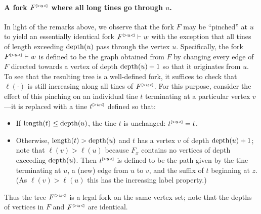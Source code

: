   \paragraph{A fork $\pinch{u}{F}$ where all long tines go through $u$.}
    In light of the remarks above, we observe that the fork $F$ may be
    ``pinched'' at $u$ to yield an essentially identical fork
    $\pinch{u}{F} \vdash w$ with the exception that all tines of length
    exceeding $\depth(u)$ pass through the vertex $u$. Specifically, the
    fork $\pinch{u}{F} \vdash w$ is defined to be the graph obtained
    from $F$ by changing every edge of $F$ directed towards a vertex of
    depth $\depth(u) + 1$ so that it originates from $u$. To see that
    the resulting tree is a well-defined fork, it suffices to check that
    $\ell(\cdot)$ is still increasing along all tines of
    $\pinch{u}{F}$. For this purpose, consider the effect of this
    pinching on an individual tine $t$ terminating at a particular
    vertex $v$---it is replaced with a tine $\pinch{u}{t}$ defined so
    that:
    \begin{itemize}
    \item If $\length(t) \leq \depth(u)$, the tine $t$ is unchanged:
      $\pinch{u}{t} = t$.
    \item Otherwise, $\length(t) > \depth(u)$ and $t$ has a vertex $v$
      of depth $\depth(u) + 1$; note that $\ell(v) > \ell(u)$ because
      $F_x$ contains no vertices of depth exceeding $\depth(u)$. Then
      $\pinch{u}{t}$ is defined to be the path given by the tine
      terminating at $u$, a (new) edge from $u$ to $v$, and the suffix
      of $t$ beginning at $z$. (As $\ell(v) > \ell(u)$ this has the
      increasing label property.)
    \end{itemize}
    Thus the tree $\pinch{u}{F}$ is a legal fork on the same vertex set;
    note that the depths of vertices in $F$ and $\pinch{u}{F}$ are
    identical.
    
